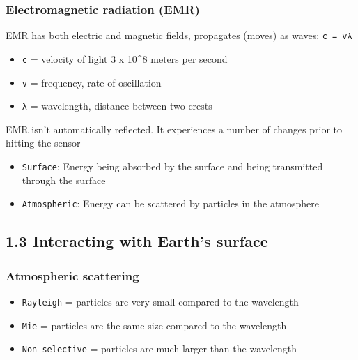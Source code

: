\documentclass[
  letterpaper,
  DIV=11,
  numbers=noendperiod]{scrreprt}
\providecommand{\tightlist}{%
  \setlength{\itemsep}{0pt}\setlength{\parskip}{0pt}}\usepackage{longtable,booktabs,array}
\begin{document}
\hypertarget{electromagnetic-radiation-emr}{%
\subsubsection*{\texorpdfstring{\textbf{Electromagnetic radiation
(EMR)}}{Electromagnetic radiation (EMR)}}\label{electromagnetic-radiation-emr}}

EMR has both electric and magnetic fields, propagates (moves) as waves:
\texttt{c\ =\ vλ}

\begin{itemize}
\tightlist
\item
  \texttt{c} = velocity of light 3 x 10\^{}8 meters per second
\item
  \texttt{v} = frequency, rate of oscillation
\item
  \texttt{λ} = wavelength, distance between two crests
\end{itemize}

EMR isn't automatically reflected. It experiences a number of changes
prior to hitting the sensor

\begin{itemize}
\tightlist
\item
  \texttt{Surface}: Energy being absorbed by the surface and being
  transmitted through the surface
\item
  \texttt{Atmospheric}: Energy can be scattered by particles in the
  atmosphere
\end{itemize}

\hypertarget{interacting-with-earths-surface}{%
\subsection*{\texorpdfstring{\textbf{1.3 Interacting with Earth's
surface}}{1.3 Interacting with Earth's surface}}\label{interacting-with-earths-surface}}

\hypertarget{atmospheric-scattering}{%
\subsubsection*{\texorpdfstring{\textbf{Atmospheric
scattering}}{Atmospheric scattering}}\label{atmospheric-scattering}}

\begin{itemize}
\tightlist
\item
  \texttt{Rayleigh} = particles are very small compared to the
  wavelength
\item
  \texttt{Mie} = particles are the same size compared to the wavelength
\item
  \texttt{Non\ selective} = particles are much larger than the
  wavelength
\end{itemize}
\end{document}
